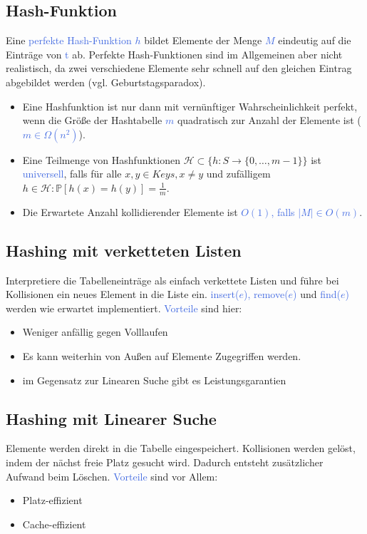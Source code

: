 \documentclass[11pt]{article}
\def \texcol{RoyalBlue}
\begin{document}
\subsection{Hash-Funktion}
Eine \textcolor{\texcol}{perfekte Hash-Funktion $h$} bildet Elemente der Menge \textcolor{\texcol}{$M$} eindeutig auf die Einträge von \textcolor{\texcol}{t} ab. Perfekte Hash-Funktionen sind im Allgemeinen aber nicht realistisch, da zwei verschiedene Elemente sehr schnell auf den gleichen Eintrag abgebildet werden (vgl. Geburtstagsparadox).
\begin{itemize} 
\item Eine Hashfunktion ist nur dann mit vernünftiger Wahrscheinlichkeit perfekt, wenn die Größe der Hashtabelle \textcolor{\texcol}{$m$} quadratisch zur Anzahl der Elemente ist (\textcolor{\texcol}{$m \in \Omega (n^2)$}).
\item Eine Teilmenge von Hashfunktionen $\mathcal{H}\subset \{h\colon S \to \{0,\dots ,m-1\}\}$ ist \textcolor{\texcol}{universell}, falls für alle $x,y \in Keys, x \neq y$ und zufälligem $h \in \mathcal{H}\colon \mathbb{P}[h(x)=h(y)]=\frac{1}{m}$.
\item Die Erwartete Anzahl kollidierender Elemente ist \textcolor{\texcol}{$O(1)$, falls $|M|\in O(m)$}.
\end{itemize}


\subsection{Hashing mit verketteten Listen}
Interpretiere die Tabelleneinträge als einfach verkettete Listen und führe bei Kollisionen ein neues Element in die Liste ein. \textcolor{\texcol}{insert($e$), remove($e$)} und \textcolor{\texcol}{find($e$)} werden wie erwartet implementiert. \textcolor{\texcol}{Vorteile} sind hier:
\begin{itemize}
\item Weniger anfällig gegen Volllaufen
\item Es kann weiterhin von Außen auf Elemente Zugegriffen werden.
\item im Gegensatz zur Linearen Suche gibt es Leistungsgarantien
\end{itemize}

\subsection{Hashing mit Linearer Suche}
Elemente werden direkt in die Tabelle eingespeichert. Kollisionen werden gelöst, indem der nächst freie Platz gesucht wird. Dadurch entsteht zusätzlicher Aufwand beim Löschen. \textcolor{\texcol}{Vorteile} sind vor Allem:
\begin{itemize}
\item Platz-effizient
\item Cache-effizient
\end{itemize}
\end{document}
